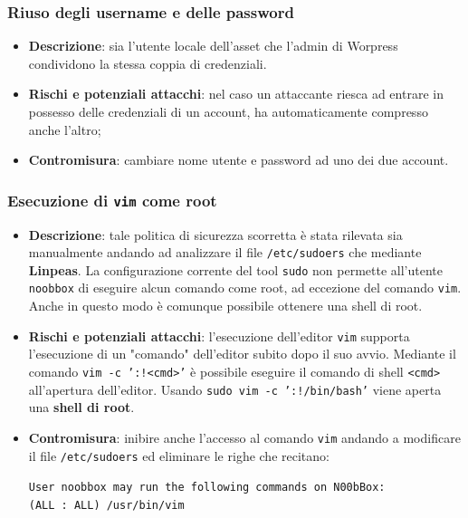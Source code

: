 \documentclass[a4paper, 12pt, oneside]{article}
\begin{document}
\subsubsection{Riuso degli username e delle password}
\begin{itemize}
    \item \textbf{Descrizione}: sia l'utente locale dell'asset che l'admin di Worpress condividono la stessa coppia di credenziali.
    \item \textbf{Rischi e potenziali attacchi}: nel caso un attaccante riesca ad entrare in possesso delle credenziali di un account, ha automaticamente compresso anche l'altro;
    \item \textbf{Contromisura}: cambiare nome utente e password ad uno dei due account.
\end{itemize}

\subsubsection{Esecuzione di \texttt{vim} come root}
\begin{itemize}
    \item \textbf{Descrizione}: tale politica di sicurezza scorretta è stata rilevata sia manualmente andando ad analizzare il file \texttt{/etc/sudoers} che mediante \textbf{Linpeas}. La configurazione corrente del tool \texttt{sudo} non permette all'utente \texttt{noobbox} di eseguire alcun comando come root, ad eccezione del comando \texttt{vim}. Anche in questo modo è comunque possibile ottenere una shell di root.
    \item \textbf{Rischi e potenziali attacchi}: l'esecuzione dell'editor \texttt{vim} supporta l'esecuzione di un "comando" dell'editor subito dopo il suo avvio. Mediante il comando \texttt{vim -c ':!<cmd>'} è possibile eseguire il comando di shell \texttt{<cmd>} all'apertura dell'editor. Usando \texttt{sudo vim -c ':!/bin/bash'} viene aperta una \textbf{shell di root}.
    \item \textbf{Contromisura}: inibire anche l'accesso al comando \texttt{vim} andando a modificare il file \texttt{/etc/sudoers} ed eliminare le righe che recitano: \begin{center}
        \texttt{User noobbox may run the following commands on N00bBox:\\
    (ALL : ALL) /usr/bin/vim}
    \end{center}
\end{itemize}
\newpage
\printbibliography[title={Riferimenti bibliografici}]
\end{document}
